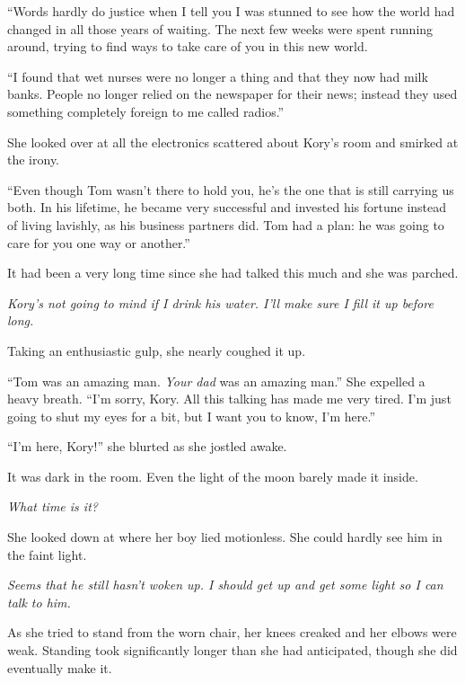 ``Words hardly do justice when I tell you I was stunned to see how the world had changed in all those years of waiting. The next few weeks were spent running around, trying to find ways to take care of you in this new world.

``I found that wet nurses were no longer a thing and that they now had milk banks. People no longer relied on the newspaper for their news; instead they used something completely foreign to me called radios.''

She looked over at all the electronics scattered about Kory's room and smirked at the irony.

``Even though Tom wasn't there to hold you, he's the one that is still carrying us both. In his lifetime, he became very successful and invested his fortune instead of living lavishly, as his business partners did. Tom had a plan: he was going to care for you one way or another.''

It had been a very long time since she had talked this much and she was parched.

\textit{Kory's not going to mind if I drink his water. I'll make sure I fill it up before long.}

Taking an enthusiastic gulp, she nearly coughed it up.

``Tom was an amazing man. \textit{Your dad} was an amazing man.'' She expelled a heavy breath. ``I'm sorry, Kory. All this talking has made me very tired. I'm just going to shut my eyes for a bit, but I want you to know, I'm here.''

\line



``I'm here, Kory!'' she blurted as she jostled awake.

It was dark in the room. Even the light of the moon barely made it inside.

\textit{What time is it?}

She looked down at where her boy lied motionless. She could hardly see him in the faint light.

\textit{Seems that he still hasn't woken up. I should get up and get some light so I can talk to him.}

As she tried to stand from the worn chair, her knees creaked and her elbows were weak. Standing took significantly longer than she had anticipated, though she did eventually make it.


